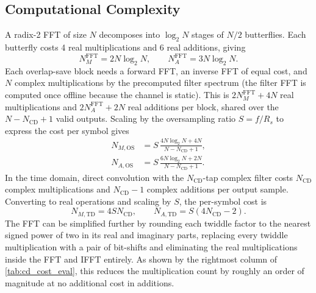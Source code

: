 \documentclass[12pt,a4paper]{article}
\begin{document}
\subsection{Computational Complexity}
A radix-2 FFT of size \(N\) decomposes into \(\log_2 N\) stages of \(N/2\) butterflies. Each butterfly costs 4 real multiplications and 6 real additions, giving
\begin{equation}
    N_M^\mathrm{FFT} = 2N\log_2 N, \qquad N_A^\mathrm{FFT} = 3N\log_2 N.
\end{equation}
Each overlap-save block needs a forward FFT, an inverse FFT of equal cost, and \(N\) complex multiplications by the precomputed filter spectrum (the filter FFT is computed once offline because the channel is static). This is \(2N_M^\mathrm{FFT} + 4N\) real multiplications and \(2N_A^\mathrm{FFT} + 2N\) real additions per block, shared over the \(N - N_\mathrm{CD} + 1\) valid outputs. Scaling by the oversampling ratio \(S = f/R_s\) to express the cost per symbol gives
\begin{equation}
\begin{aligned}
    N_{M,\mathrm{OS}} &= S\,\frac{4N\log_2 N + 4N}{N - N_\mathrm{CD} + 1}, \\[2pt]
    N_{A,\mathrm{OS}} &= S\,\frac{6N\log_2 N + 2N}{N - N_\mathrm{CD} + 1}.
\end{aligned}
\end{equation}
In the time domain, direct convolution with the \(N_\mathrm{CD}\)-tap complex filter costs \(N_\mathrm{CD}\) complex multiplications and \(N_\mathrm{CD}-1\) complex additions per output sample. Converting to real operations and scaling by \(S\), the per-symbol cost is
\begin{equation}
    N_{M,\mathrm{TD}} = 4 S N_\mathrm{CD}, \qquad N_{A,\mathrm{TD}} = S\left(4N_\mathrm{CD} - 2\right).
\end{equation}
The FFT can be simplified further by rounding each twiddle factor to the nearest signed power of two in its real and imaginary parts, replacing every twiddle multiplication with a pair of bit-shifts and eliminating the real multiplications inside the FFT and IFFT entirely. As shown by the rightmost column of \cref{tab:cd_cost_eval}, this reduces the multiplication count by roughly an order of magnitude at no additional cost in additions.
\end{document}
